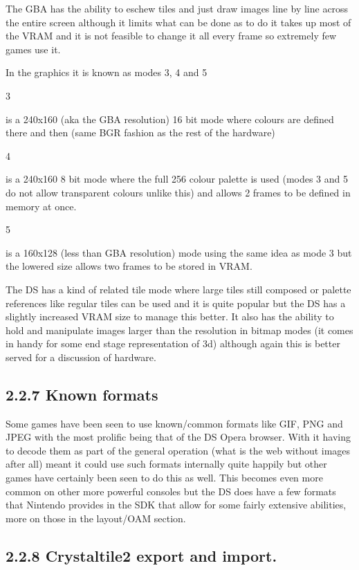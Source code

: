 \documentclass[
]{book}
\begin{document}
The GBA has the ability to eschew tiles and just draw images line by line across the entire screen although it limits what can be done as to do it takes up most of the VRAM and it is not feasible to change it all every frame so extremely few games use it.

In the graphics it is known as modes 3, 4 and 5

3

is a 240x160 (aka the GBA resolution) 16 bit mode where colours are defined there and then (same BGR fashion as the rest of the hardware)

4

is a 240x160 8 bit mode where the full 256 colour palette is used (modes 3 and 5 do not allow transparent colours unlike this) and allows 2 frames to be defined in memory at once.

5

is a 160x128 (less than GBA resolution) mode using the same idea as mode 3 but the lowered size allows two frames to be stored in VRAM.

The DS has a kind of related tile mode where large tiles still composed or palette references like regular tiles can be used and it is quite popular but the DS has a slightly increased VRAM size to manage this better. It also has the ability to hold and manipulate images larger than the resolution in bitmap modes (it comes in handy for some end stage representation of 3d) although again this is better served for a discussion of hardware.

\hypertarget{known-formats}{%
\subsection{2.2.7 Known formats}\label{known-formats}}

Some games have been seen to use known/common formats like GIF, PNG and JPEG with the most prolific being that of the DS Opera browser. With it having to decode them as part of the general operation (what is the web without images after all) meant it could use such formats internally quite happily but other games have certainly been seen to do this as well. This becomes even more common on other more powerful consoles but the DS does have a few formats that Nintendo provides in the SDK that allow for some fairly extensive abilities, more on those in the layout/OAM section.

\hypertarget{crystaltile2-export-and-import.}{%
\subsection{2.2.8 Crystaltile2 export and import.}\label{crystaltile2-export-and-import.}}
\end{document}
